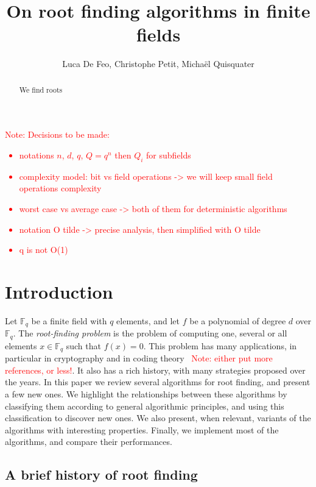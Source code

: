 \documentclass{article}
\author{Luca De Feo, Christophe Petit, Micha\"el Quisquater}
\title{On root finding algorithms in finite fields}
\newcommand{\ff}[1]{\mathbb{F}_{#1}}
\newcounter{algo}
\newcommand{\Notes}[1]{\textcolor{red}{Note: #1}}
\begin{document}
\maketitle
\begin{abstract}
  We find roots
\end{abstract}


\Notes{
Decisions to be made:
\begin{itemize}
\item notations $n$, $d$, $q$, $Q=q^n$ then $Q_i$ for subfields
\item complexity model: bit vs field operations -> we will keep small field operations complexity
\item worst case vs average case -> both of them for deterministic algorithms
\item notation O tilde -> precise analysis, then simplified with O tilde
\item q is not O(1)
\end{itemize}
}




\section{Introduction}
\label{sec:introduction}

Let $\ff{q}$ be a finite field with $q$ elements, and let $f$ be a
polynomial of degree $d$ over $\ff{q}$.
%
The \emph{root-finding problem} is the problem of computing one,
several or all elements $x∈\ff{q}$ such that $f(x)=0$.
%
This problem has many applications, in particular in cryptography and
in coding theory~\cite{McEliece78} \Notes{either put more references,
  or less!}. It also has a rich history, with many strategies proposed
over the years. In this paper we review several algorithms for root
finding, and present a few new ones.  We highlight the relationships
between these algorithms by classifying them according to general
algorithmic principles, and using this classification to discover new
ones. We also present, when relevant, variants of the algorithms with
interesting properties. Finally, we implement most of the algorithms,
and compare their performances.

\subsection{A brief history of root finding}
\label{sec:brief-history-root}
\end{document}
